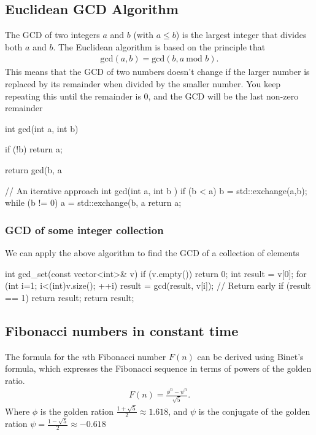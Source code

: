 \documentclass{report}
\begin{document}
\pagebreak 
{}
\bigbreak \noindent 
\subsection{Euclidean GCD Algorithm}
\bigbreak \noindent 
The GCD of two integers $a$ and $b$ (with $a \leq b$) is the largest integer that divides both $a$ and $b$. The Euclidean algorithm is based on the principle that
\begin{align*}
    \text{gcd}(a,b) = \text{gcd}(b, a\ \text{mod } b)
.\end{align*}
\bigbreak \noindent 
This means that the GCD of two numbers doesn't change if the larger number is replaced by its remainder when divided by the smaller number. You keep repeating this until the remainder is 0, and the GCD will be the last non-zero remainder
\bigbreak \noindent 
\begin{cppcode}
    int gcd(int a, int b)  {
        if (!b) return a;

        return gcd(b, a%
    }
    // An iterative approach
    int gcd(int a, int b ) {
        if (b < a) {
            b = std::exchange(a,b);
        }
        while (b != 0) {
            a = std::exchange(b, a %
        }
        return a;
    }
\end{cppcode}
\bigbreak \noindent 
\subsubsection{GCD of some integer collection}
\bigbreak \noindent 
We can apply the above algorithm to find the GCD of a collection of elements
\bigbreak \noindent 
\begin{cppcode}
    int gcd_set(const vector<int>& v) {
        if (v.empty()) return 0;
        int result = v[0];
        for (int i=1; i<(int)v.size(); ++i) {
            result = gcd(result, v[i]);
            // Return early
            if (result == 1) return result;
        }
        return result;
    }
\end{cppcode}

\bigbreak \noindent 
\subsection{Fibonacci numbers in constant time}
\bigbreak \noindent 
The formula for the $n$th Fibonacci number $F(n)$ can be derived using Binet's formula, which expresses the Fibonacci sequence in terms of powers of the golden ratio.
\begin{align*}
    F(n) = \frac{\phi^{n} - \psi^{n}}{\sqrt{5}}
.\end{align*}
Where $\phi$ is the golden ration $\frac{1+\sqrt{5}}{2} \approx 1.618 $, and $\psi$ is the conjugate of the golden ration $\psi = \frac{1- \sqrt{5}}{2} \approx -0.618 $
\end{document}
